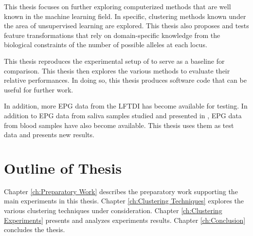 This thesis focuses on further exploring computerized methods that are well known in the machine learning field. In specific, clustering methods known under the area of unsupervised learning are explored. This thesis also proposes and tests feature transformations that rely on domain-specific knowledge from the biological constraints of the number of possible alleles at each locus.

This thesis reproduces the experimental setup of \cite{odonnell_clustering_2021} to serve as a baseline for comparison. This thesis then explores the various methods to evaluate their relative performances. In doing so, this thesis produces software code that can be useful for further work.

In addition, more EPG data from the LFTDI has become available for testing. In addition to EPG data from saliva samples studied and presented in \cite{odonnell_clustering_2021}, EPG data from blood samples have also become available. This thesis uses them as test data and presents new results.

\section{Outline of Thesis}

Chapter \ref{ch:Preparatory Work} describes the preparatory work supporting the main experiments in this thesis. Chapter \ref{ch:Clustering Techniques} explores the various clustering techniques under consideration. Chapter \ref{ch:Clustering Experiments} presents and analyzes experiments results. Chapter \ref{ch:Conclusion} concludes the thesis.
